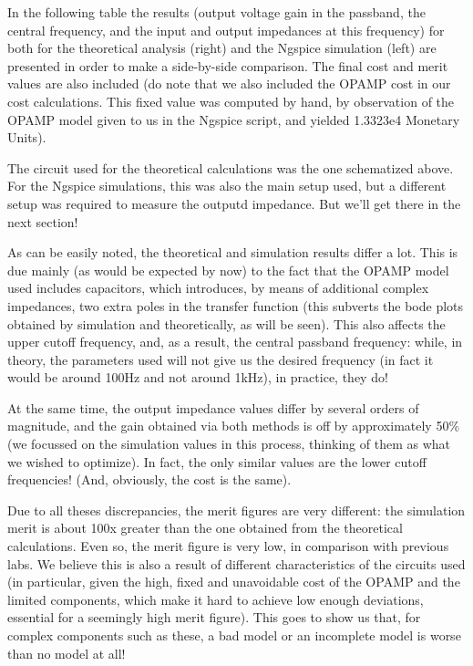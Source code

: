 In the following table the results (output voltage gain in the passband, the central frequency, and the input and output impedances at this frequency) for both for the theoretical analysis (right) and the Ngspice simulation (left) are presented in order to make a side-by-side comparison. The final cost and merit values are also included (do note that we also included the OPAMP cost in our cost calculations. This fixed value was computed by hand, by observation of the OPAMP model given to us in the Ngspice script, and yielded 1.3323e4 Monetary Units).\par
The circuit used for the theoretical calculations was the one schematized above. For the Ngspice simulations, this was also the main setup used, but a different setup was required to measure the outputd impedance. But we'll get there in the next section!\par
As can be easily noted, the theoretical and simulation results differ a lot. This is due mainly (as would be expected by now) to the fact that the OPAMP model used includes capacitors, which introduces, by means of additional complex impedances, two extra poles in the transfer function (this subverts the bode plots obtained by simulation and theoretically, as will be seen). This also affects the upper cutoff frequency, and, as a result, the central passband frequency: while, in theory, the parameters used will not give us the desired frequency (in fact it would be around 100Hz and not around 1kHz), in practice, they do! \par
At the same time, the output impedance values differ by several orders of magnitude, and the gain obtained via both methods is off by approximately 50\% (we focussed on the simulation values in this process, thinking of them as what we wished to optimize). In fact, the only similar values are the lower cutoff frequencies! (And, obviously, the cost is the same).\par
Due to all theses discrepancies, the merit figures are very different: the simulation merit is about 100x greater than the one obtained from the theoretical calculations. Even so, the merit figure is very low, in comparison with previous labs. We believe this is also a result of different characteristics of the circuits used (in particular, given the high, fixed and unavoidable cost of the OPAMP and the limited components, which make it hard to achieve low enough deviations, essential for a seemingly high merit figure). This goes to show us that, for complex components such as these, a bad model or an incomplete model is worse than no model at all!\par

